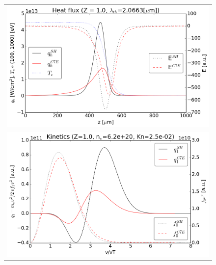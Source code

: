 \documentclass[preprint,12pt]{elsarticle}
\begin{document}
\begin{figure}[tbh]
  \begin{center}
    \begin{tabular}{c}
      \includegraphics[width=1.0\textwidth]{../results/fe_analysis/C7E/P5_heatflux_Z1_Kn25e-3.png} \\ 
      \includegraphics[width=1.0\textwidth]{../results/fe_analysis/C7E/P5_kinetics_Z1_Kn25e-3.png}
    \end{tabular}
  \caption{
  }
  \end{center}
  \label{fig:AWBScorrection_f1}
\end{figure}
\end{document}
